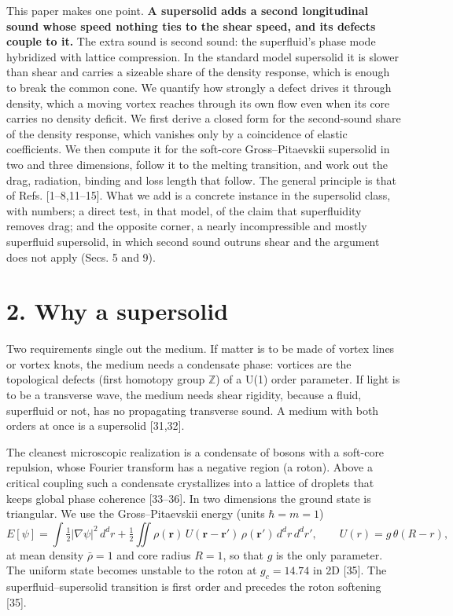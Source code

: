 \documentclass[
  11pt,
]{article}
\begin{document}
This paper makes one point. \textbf{A supersolid adds a second
longitudinal sound whose speed nothing ties to the shear speed, and its
defects couple to it.} The extra sound is second sound: the superfluid's
phase mode hybridized with lattice compression. In the standard model
supersolid it is slower than shear and carries a sizeable share of the
density response, which is enough to break the common cone. We quantify
how strongly a defect drives it through density, which a moving vortex
reaches through its own flow even when its core carries no density
deficit. We first derive a closed form for the second-sound share of the
density response, which vanishes only by a coincidence of elastic
coefficients. We then compute it for the soft-core Gross--Pitaevskii
supersolid in two and three dimensions, follow it to the melting
transition, and work out the drag, radiation, binding and loss length
that follow. The general principle is that of Refs. {[}1--8,11--15{]}.
What we add is a concrete instance in the supersolid class, with
numbers; a direct test, in that model, of the claim that superfluidity
removes drag; and the opposite corner, a nearly incompressible and
mostly superfluid supersolid, in which second sound outruns shear and
the argument does not apply (Secs. 5 and 9).

\hypertarget{why-a-supersolid}{%
\section{2. Why a supersolid}\label{why-a-supersolid}}

Two requirements single out the medium. If matter is to be made of
vortex lines or vortex knots, the medium needs a condensate phase:
vortices are the topological defects (first homotopy group
\(\mathbb Z\)) of a U(1) order parameter. If light is to be a transverse
wave, the medium needs shear rigidity, because a fluid, superfluid or
not, has no propagating transverse sound. A medium with both orders at
once is a supersolid {[}31,32{]}.

The cleanest microscopic realization is a condensate of bosons with a
soft-core repulsion, whose Fourier transform has a negative region (a
roton). Above a critical coupling such a condensate crystallizes into a
lattice of droplets that keeps global phase coherence {[}33--36{]}. In
two dimensions the ground state is triangular. We use the
Gross--Pitaevskii energy (units \(\hbar=m=1\))
\[E[\psi]=\int \tfrac12|\nabla\psi|^2\,d^dr+\tfrac12\iint \rho(\mathbf r)\,U(\mathbf r-\mathbf r')\,\rho(\mathbf r')\,d^dr\,d^dr',\qquad U(r)=g\,\theta(R-r),\]
at mean density \(\bar\rho=1\) and core radius \(R=1\), so that \(g\) is
the only parameter. The uniform state becomes unstable to the roton at
\(g_c=14.74\) in 2D {[}35{]}. The superfluid--supersolid transition is
first order and precedes the roton softening {[}35{]}.
\end{document}
